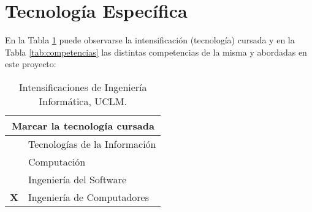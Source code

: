 
\newpage
\section{Tecnología Específica}
\label{sec:technology}

En la Tabla \ref{tab:intensificacion} puede observarse la intensificación (tecnología) cursada y en la Tabla \ref{tab:competencias} las distintas competencias de la misma y abordadas en este proyecto:

\begin{table}[h]
    \centering
    \def\tablename{Tabla}
    \caption{Intensificaciones de Ingeniería Informática, UCLM.}
    \vspace{0.5em}
    \begin{tabular}{ | c || l | }
        \hline
        \multicolumn{2}{|c|}{\bfseries Marcar la tecnología cursada}\\ \hline\hline
         & Tecnologías de la Información \\ \hline
         & Computación \\ \hline
         & Ingeniería del Software \\ \hline
         {\bfseries X} & Ingeniería de Computadores \\ \hline
    \end{tabular}
    \label{tab:intensificacion}
\end{table}

